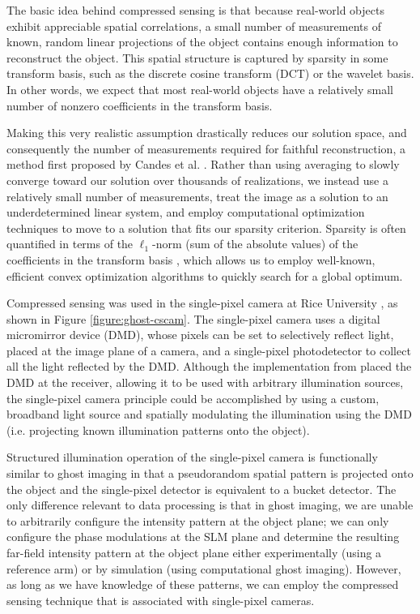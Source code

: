 The basic idea behind compressed sensing is that because real-world objects exhibit appreciable spatial correlations, a small number of measurements of known, random linear projections of the object contains enough information to reconstruct the object. This spatial structure is captured by sparsity in some transform basis, such as the discrete cosine transform (DCT) or the wavelet basis. In other words, we expect that most real-world objects have a relatively small number of nonzero coefficients in the transform basis.

Making this very realistic assumption drastically reduces our solution space, and consequently the number of measurements required for faithful reconstruction, a method first proposed by Candes et al. \cite{candes-stable}. Rather than using averaging to slowly converge toward our solution over thousands of realizations, we instead use a relatively small number of measurements, treat the image as a solution to an underdetermined linear system, and employ computational optimization techniques to move to a solution that fits our sparsity criterion. Sparsity is often quantified in terms of the $\ell_1$-norm (sum of the absolute values) of the coefficients in the transform basis \cite{candes-stable}, which allows us to employ well-known, efficient convex optimization algorithms to quickly search for a global optimum.

Compressed sensing was used in the single-pixel camera at Rice University \cite{duarte-single}, as shown in Figure \ref{figure:ghost-cscam}. The single-pixel camera uses a digital micromirror device (DMD), whose pixels can be set to selectively reflect light, placed at the image plane of a camera, and a single-pixel photodetector to collect all the light reflected by the DMD. Although the implementation from \cite{duarte-single} placed the DMD at the receiver, allowing it to be used with arbitrary illumination sources, the single-pixel camera principle could be accomplished by using a custom, broadband light source and spatially modulating the illumination using the DMD (i.e. projecting known illumination patterns onto the object).

Structured illumination operation of the single-pixel camera is functionally similar to ghost imaging in that a pseudorandom spatial pattern is projected onto the object and the single-pixel detector is equivalent to a bucket detector. The only difference relevant to data processing is that in ghost imaging, we are unable to arbitrarily configure the intensity pattern at the object plane; we can only configure the phase modulations at the SLM plane and determine the resulting far-field intensity pattern at the object plane either experimentally (using a reference arm) or by simulation (using computational ghost imaging). However, as long as we have knowledge of these patterns, we can employ the compressed sensing technique that is associated with single-pixel cameras.

